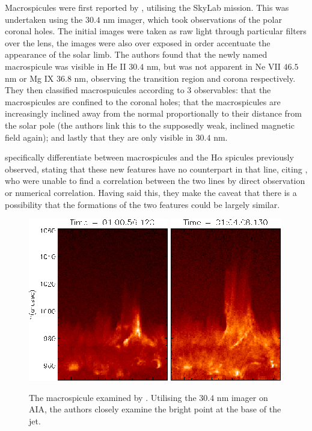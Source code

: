 Macrospicules were first reported by \cite{Bohlin1975}, utilising the SkyLab mission.
This was undertaken using the $30.4$ nm imager, which took observations of the polar coronal holes.
The initial images were taken as raw light through particular filters over the lens, the images were also over exposed in order accentuate the appearance of the solar limb.
The authors found that the newly named macrospicule was visible in He II $30.4$ nm, but was not apparent in Ne VII $46.5$ nm or Mg IX $36.8$ nm, observing the transition region and corona respectively.
They then classified macrospuicules according to 3 observables: that the macrospicules are confined to the coronal holes; that the macrospicules are increasingly inclined away from the normal proportionally to their distance from the solar pole (the authors link this to the supposedly weak, inclined magnetic field again); and lastly that they are only visible in $30.4$ nm. %

\cite{Bohlin1975} specifically differentiate between macrospicules and the H$\alpha$ spicules previously observed, stating that these new features have no counterpart in that line, citing \cite{Engvold1975}, who were unable to find a correlation between the two lines by direct observation or numerical correlation.
Having said this, they make the caveat that there is a possibility that the formations of the two features could be largely similar.

\begin{figure}
	\centering
	\includegraphics[scale=0.7]{Chapter2/Figs/MS1}
	\includegraphics[scale=0.7]{Chapter2/Figs/MS2}
	\caption{The macrospicule examined by \cite{Kayshap2013}. Utilising the $30.4$ nm imager on AIA, the authors closely examine the bright point at the base of the jet.}
\end{figure}


